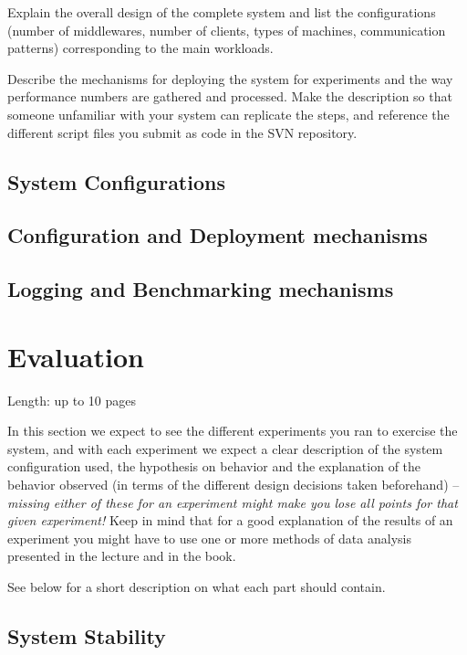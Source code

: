 \documentclass[11pt]{article}
\begin{document}
Explain the overall design of the complete system and list the
configurations (number of middlewares, number of clients, types of
machines, communication patterns) corresponding to the main workloads.

Describe the mechanisms for deploying the system for experiments and the
way performance numbers are gathered and processed. Make the description
so that someone unfamiliar with your system can replicate the steps, and
reference the different script files you submit as code in the SVN
repository.

\subsection{System Configurations}\label{sec:system-configurations}

\subsection{Configuration and Deployment mechanisms}\label{sec:configuration-and-deployment-mechanisms}

\subsection{Logging and Benchmarking mechanisms}\label{sec:logging-and-benchmarking-mechanisms}

\section{Evaluation}\label{sec:evaluation}

Length: up to 10 pages

In this section we expect to see the different experiments you ran to
exercise the system, and with each experiment we expect a clear
description of the system configuration used, the hypothesis on behavior
and the explanation of the behavior observed (in terms of the different
design decisions taken beforehand) -- \emph{missing either of these for
an experiment might make you lose all points for that given experiment!}
Keep in mind that for a good explanation of the results of an experiment
you might have to use one or more methods of data analysis presented in
the lecture and in the book.

See below for a short description on what each part should contain.

\subsection{System Stability}\label{sec:system-stability}
\end{document}
